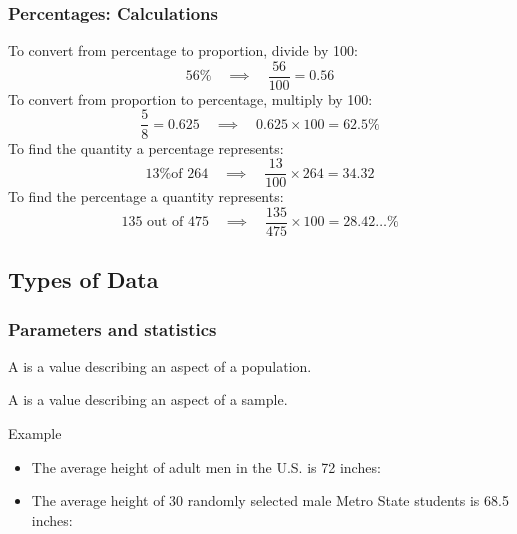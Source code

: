 \documentclass[xcolor=table, handout]{beamer}
\begin{document}
\begin{frame}
\frametitle{Percentages: Calculations}
\begin{exampleblock}{}
To convert from percentage to proportion, divide by 100:
\[56\% \quad \implies \quad \frac {56}{100} = 0.56\]
\pause
To convert from proportion to percentage, multiply by 100:
\[\frac 5 8 = 0.625 \quad \implies \quad 0.625 \times 100 = 62.5\%\]
\pause
To find the quantity a percentage represents:
\[\text{13\% of 264}\quad \implies \quad \frac {13}{100} \times 264 = 34.32\]
\pause
To find the percentage a quantity represents:
\[\text{135 out of 475} \quad \implies \quad \frac {135}{475} \times 100 = 28.42\ldots \%\]
\end{exampleblock}
\end{frame}

\subsection{Types of Data}

\begin{frame}
\frametitle{Parameters and statistics}

\begin{block}{}
\large A  is a value describing an aspect of a population.
\end{block}
\pause
\begin{block}{}
\large A  is a value describing an aspect of a sample.
\end{block}
\pause
\begin{exampleblock}{Example}
\begin{itemize}
\item The average height of adult men in the U.S. is 72 inches: 

\item The average height of 30 randomly selected male Metro State students is 68.5 inches: 
\end{itemize}
\end{exampleblock}

\end{frame}
\end{document}
